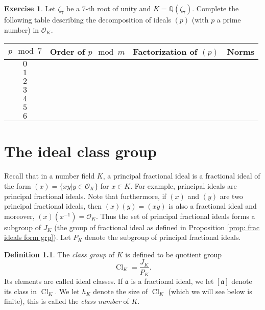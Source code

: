 \documentclass[11pt,a4paper]{report}
\theoremstyle{plain}
\theoremstyle{definition}
\newtheorem{definition}[subsection]{Definition}
\theoremstyle{definition}
\newtheorem{question}[subsection]{Exercise}
\def\QQ{\mathbb{Q}}
\def \OO {\mathcal{O}}
\def\gotha{\mathfrak{a}}
\DeclareMathOperator{\Cl}{Cl}
\begin{document}
	
	\begin{question}
		Let $\zeta_7$  be a $7$-th root of unity and $K=\QQ(\zeta_7)$. Complete the following table describing the decomposition of ideals $(p)$ (with $p$ a prime number) in $\OO_K$.
		\begin{center}
			\begin{tabular}{ | c | c |  c | c |}
				\hline
				
				$p \mod 7$ & Order of  $p \mod m$ & Factorization of $(p)$ & Norms   \\ \hline
				$0$ &  &  &  \\  \hline
				$1$ &  & &  \\  \hline
				$2$ &  & &  \\  \hline
				$3$ &  &  &  \\  \hline	
				$4$ & & & \\  \hline
				$5$ &  & & \\  \hline
				$6$ &  &  & \\  \hline
			\end{tabular}			
		\end{center}
		
	\end{question}
	
	
	
	
	\chapter{The ideal class group}
	
	
	
	Recall that in a number field $K$, a principal fractional ideal is a fractional ideal of the form $(x)=\{xy| y \in \OO_K\}$ for $x \in K$. For example, principal ideals are principal fractional ideals. Note that furthermore, if $(x)$ and $(y)$ are two principal fractional ideals, then $(x)(y)=(xy)$ is also a fractional ideal and moreover, $(x)(x^{-1})=\OO_K$. Thus the set of principal fractional ideals forms a subgroup of $J_K$ (the group of fractional ideal as defined in Proposition \ref{prop: frac ideals form grp}). Let $P_K$ denote the subgroup of principal fractional ideals.
	
	\begin{definition}
		The \textit{class group} of $K$ is defined to be quotient group \[\Cl_K=\frac{J_K}{P_K}. \] Its elements are called ideal classes. If $\gotha$ is a fractional ideal, we let $[\gotha]$ denote its class in $\Cl_K$. We let $h_K$ denote the size of $\Cl_K$ (which we will see below is finite), this is called the \textit{class number} of $K$. 
	\end{definition}
	
\end{document}
